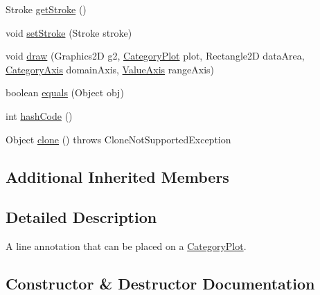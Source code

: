 \begin{DoxyCompactItemize}
Stroke \mbox{\hyperlink{classorg_1_1jfree_1_1chart_1_1annotations_1_1_category_line_annotation_a3911b0d648b52e13cf946df090854aee}{get\+Stroke}} ()
\item 
void \mbox{\hyperlink{classorg_1_1jfree_1_1chart_1_1annotations_1_1_category_line_annotation_a0f78238a070be985783f23037603b14e}{set\+Stroke}} (Stroke stroke)
\item 
void \mbox{\hyperlink{classorg_1_1jfree_1_1chart_1_1annotations_1_1_category_line_annotation_af5d6ed4dc7fef3a18edf94c0cce35663}{draw}} (Graphics2D g2, \mbox{\hyperlink{classorg_1_1jfree_1_1chart_1_1plot_1_1_category_plot}{Category\+Plot}} plot, Rectangle2D data\+Area, \mbox{\hyperlink{classorg_1_1jfree_1_1chart_1_1axis_1_1_category_axis}{Category\+Axis}} domain\+Axis, \mbox{\hyperlink{classorg_1_1jfree_1_1chart_1_1axis_1_1_value_axis}{Value\+Axis}} range\+Axis)
\item 
boolean \mbox{\hyperlink{classorg_1_1jfree_1_1chart_1_1annotations_1_1_category_line_annotation_a9d30a51d83e1a91ad903bd1a8ff7cf8d}{equals}} (Object obj)
\item 
int \mbox{\hyperlink{classorg_1_1jfree_1_1chart_1_1annotations_1_1_category_line_annotation_aa0d5fb7fffa526636264edf58ca4dcab}{hash\+Code}} ()
\item 
Object \mbox{\hyperlink{classorg_1_1jfree_1_1chart_1_1annotations_1_1_category_line_annotation_a68cc7f6b949bf9481324f9ba48a84f60}{clone}} ()  throws Clone\+Not\+Supported\+Exception 
\end{DoxyCompactItemize}
\subsection*{Additional Inherited Members}


\subsection{Detailed Description}
A line annotation that can be placed on a \mbox{\hyperlink{}{Category\+Plot}}. 

\subsection{Constructor \& Destructor Documentation}
\mbox{\label{classorg_1_1jfree_1_1chart_1_1annotations_1_1_category_line_annotation_a9d6d73b827e70bed39f54fd25c72bd6c}} 

